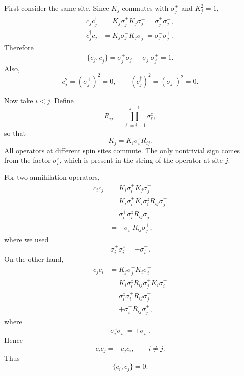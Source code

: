 First consider the same site. Since \(K_j\) commutes with \(\sigma_j^\pm\) and
\(K_j^2=1\),
\begin{align}
    c_jc_j^\dagger
    &=
    K_j\sigma_j^+K_j\sigma_j^-
    =
    \sigma_j^+\sigma_j^-,
    \\
    c_j^\dagger c_j
    &=
    K_j\sigma_j^-K_j\sigma_j^+
    =
    \sigma_j^-\sigma_j^+.
\end{align}
Therefore
\begin{equation}
    \{c_j,c_j^\dagger\}
    =
    \sigma_j^+\sigma_j^-
    +
    \sigma_j^-\sigma_j^+
    =
    1.
\end{equation}
Also,
\begin{equation}
    c_j^2=(\sigma_j^+)^2=0,
    \qquad
    (c_j^\dagger)^2=(\sigma_j^-)^2=0.
\end{equation}

Now take \(i<j\). Define
\begin{equation}
    R_{ij}
    =
    \prod_{\ell=i+1}^{j-1}\sigma_\ell^z,
\end{equation}
so that
\begin{equation}
    K_j = K_i\sigma_i^zR_{ij}.
\end{equation}
All operators at different spin sites commute. The only nontrivial sign comes from
the factor \(\sigma_i^z\), which is present in the string of the operator at site \(j\).

For two annihilation operators,
\begin{align}
    c_i c_j
    &=
    K_i\sigma_i^+K_j\sigma_j^+
    \nonumber\\
    &=
    K_i\sigma_i^+K_i\sigma_i^zR_{ij}\sigma_j^+
    \nonumber\\
    &=
    \sigma_i^+\sigma_i^zR_{ij}\sigma_j^+
    \nonumber\\
    &=
    -\sigma_i^+R_{ij}\sigma_j^+,
\end{align}
where we used
\begin{equation}
    \sigma_i^+\sigma_i^z=-\sigma_i^+.
\end{equation}
On the other hand,
\begin{align}
    c_j c_i
    &=
    K_j\sigma_j^+K_i\sigma_i^+
    \nonumber\\
    &=
    K_i\sigma_i^zR_{ij}\sigma_j^+K_i\sigma_i^+
    \nonumber\\
    &=
    \sigma_i^z\sigma_i^+R_{ij}\sigma_j^+
    \nonumber\\
    &=
    +\sigma_i^+R_{ij}\sigma_j^+,
\end{align}
where
\begin{equation}
    \sigma_i^z\sigma_i^+=+\sigma_i^+.
\end{equation}
Hence
\begin{equation}
    c_ic_j=-c_jc_i,
    \qquad i\neq j.
\end{equation}
Thus
\begin{equation}
    \{c_i,c_j\}=0.
\end{equation}

